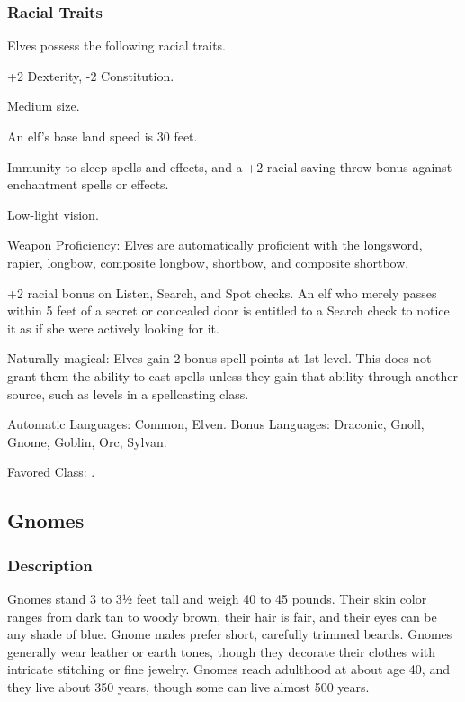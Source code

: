\subsubsection{Racial Traits}
Elves possess the following racial traits.

\begin{list}{}{\leftmargin=1em}
 \item +2 Dexterity, -2 Constitution.
 \item Medium size.
 \item An elf's base land speed is 30 feet.
 \item Immunity to sleep spells and effects, and a +2 racial saving throw bonus against enchantment spells or effects.
 \item Low-light vision.
 \item Weapon Proficiency: Elves are automatically proficient with the longsword, rapier, longbow, composite longbow, shortbow, and composite shortbow.
 \item +2 racial bonus on Listen, Search, and Spot checks. An elf who merely passes within 5 feet of a secret or concealed door is entitled to a Search check to notice it as if she were actively looking for it.
 \item Naturally magical: Elves gain 2 bonus spell points at 1st level. This does not grant them the ability to cast spells unless they gain that ability through another source, such as levels in a spellcasting class.
 \item Automatic Languages: Common, Elven. Bonus Languages: Draconic, Gnoll, Gnome, Goblin, Orc, Sylvan.
 \item Favored Class: .
\end{list}
\subsection{Gnomes}
\subsubsection{Description}
Gnomes stand 3 to 3½ feet tall and weigh 40 to 45 pounds. Their skin color ranges from dark tan to woody brown, their hair is fair, and their eyes can be any shade of blue. Gnome males prefer short, carefully trimmed beards. Gnomes generally wear leather or earth tones, though they decorate their clothes with intricate stitching or fine jewelry. Gnomes reach adulthood at about age 40, and they live about 350 years, though some can live almost 500 years.


